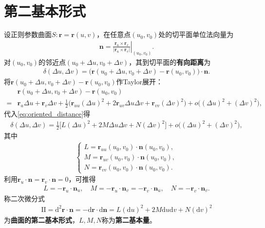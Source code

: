 \documentclass[../../main.tex]{subfiles}%
\begin{document}
\section{第二基本形式}

\begin{definition}
设正则参数曲面$S:\boldsymbol{r}=\boldsymbol{r}(u,v)$，在任意点$(u_0,v_0)$处的切平面单位法向量为
\begin{align}
\boldsymbol{n}=\left.\frac{\boldsymbol{r}_u\times\boldsymbol{r}_v}{|\boldsymbol{r}_u\times\boldsymbol{r}_v|}\right|_{(u_0,v_0)}.\label{eq:unit_normal}
\end{align}
对$(u_0,v_0)$的邻近点$(u_0+\Delta u,v_0+\Delta v)$，其到切平面的\textbf{有向距离}为
\begin{align}
\delta(\Delta u,\Delta v)=\big(\boldsymbol{r}(u_0+\Delta u,v_0+\Delta v)-\boldsymbol{r}(u_0,v_0)\big)\cdot\boldsymbol{n}.\label{eq:oriented_distance}
\end{align}
将$\boldsymbol{r}(u_0+\Delta u,v_0+\Delta v)-\boldsymbol{r}(u_0,v_0)$作Taylor展开：
\begin{align*}
&\boldsymbol{r}(u_0+\Delta u,v_0+\Delta v)-\boldsymbol{r}(u_0,v_0)\\
=&\boldsymbol{r}_u\Delta u+\boldsymbol{r}_v\Delta v+\frac{1}{2}\big(\boldsymbol{r}_{uu}(\Delta u)^2+2\boldsymbol{r}_{uv}\Delta u\Delta v+\boldsymbol{r}_{vv}(\Delta v)^2\big)+o\big((\Delta u)^2+(\Delta v)^2\big),
\end{align*}
代入\eqref{eq:oriented_distance}得
\begin{align}
\delta(\Delta u,\Delta v)=\frac{1}{2}\big[L(\Delta u)^2+2M\Delta u\Delta v+N(\Delta v)^2\big]+o\big((\Delta u)^2+(\Delta v)^2\big),\label{eq:delta_taylor}
\end{align}
其中
\begin{align}
\begin{cases}
L=\boldsymbol{r}_{uu}(u_0,v_0)\cdot\boldsymbol{n}(u_0,v_0),\\
M=\boldsymbol{r}_{uv}(u_0,v_0)\cdot\boldsymbol{n}(u_0,v_0),\\
N=\boldsymbol{r}_{vv}(u_0,v_0)\cdot\boldsymbol{n}(u_0,v_0).
\end{cases}\label{eq:LMN_def}
\end{align}
利用$\boldsymbol{r}_u\cdot\boldsymbol{n}=\boldsymbol{r}_v\cdot\boldsymbol{n}=0$，可推得
\begin{align}
L=-\boldsymbol{r}_u\cdot\boldsymbol{n}_u,\quad M=-\boldsymbol{r}_u\cdot\boldsymbol{n}_v=-\boldsymbol{r}_v\cdot\boldsymbol{n}_u,\quad N=-\boldsymbol{r}_v\cdot\boldsymbol{n}_v.\label{eq:LMN_alt}
\end{align}
称二次微分式
\begin{align}
\mathrm{II}=\mathrm{d}^2\boldsymbol{r}\cdot\boldsymbol{n}=-\mathrm{d}\boldsymbol{r}\cdot\mathrm{d}\boldsymbol{n}=L(\mathrm{d}u)^2+2M\mathrm{d}u\mathrm{d}v+N(\mathrm{d}v)^2\label{eq:second_fundamental_form}
\end{align}
为\textbf{曲面的第二基本形式}，$L,M,N$称为\textbf{第二基本量}。
\end{definition}
\end{document}
